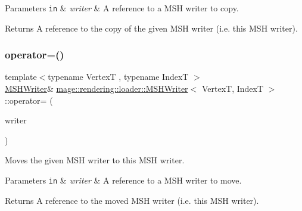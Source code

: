 \begin{DoxyParams}[1]{Parameters}
\mbox{\tt in}  & {\em writer} & A reference to a M\+SH writer to copy. \\
\hline
\end{DoxyParams}
\begin{DoxyReturn}{Returns}
A reference to the copy of the given M\+SH writer (i.\+e. this M\+SH writer). 
\end{DoxyReturn}
\hypertarget{classmage_1_1rendering_1_1loader_1_1_m_s_h_writer_a98bdde59fa1a7a6398453f0c7bc4e8dd}{}\label{classmage_1_1rendering_1_1loader_1_1_m_s_h_writer_a98bdde59fa1a7a6398453f0c7bc4e8dd} 
\subsubsection{\texorpdfstring{operator=()}{operator=()}\hspace{0.1cm}{\footnotesize\ttfamily [2/2]}}
{\footnotesize\ttfamily template$<$typename VertexT , typename IndexT $>$ \\
\hyperlink{classmage_1_1rendering_1_1loader_1_1_m_s_h_writer}{M\+S\+H\+Writer}\& \hyperlink{classmage_1_1rendering_1_1loader_1_1_m_s_h_writer}{mage\+::rendering\+::loader\+::\+M\+S\+H\+Writer}$<$ VertexT, IndexT $>$\+::operator= (\begin{DoxyParamCaption}\item[{\hyperlink{classmage_1_1rendering_1_1loader_1_1_m_s_h_writer}{M\+S\+H\+Writer}$<$ VertexT, IndexT $>$ \&\&}]{writer }\end{DoxyParamCaption})\hspace{0.3cm}{\ttfamily [delete]}}

Moves the given M\+SH writer to this M\+SH writer.


\begin{DoxyParams}[1]{Parameters}
\mbox{\tt in}  & {\em writer} & A reference to a M\+SH writer to move. \\
\hline
\end{DoxyParams}
\begin{DoxyReturn}{Returns}
A reference to the moved M\+SH writer (i.\+e. this M\+SH writer). 
\end{DoxyReturn}
\hypertarget{classmage_1_1rendering_1_1loader_1_1_m_s_h_writer_ad61ee7097e1bfb52ca9a0697d2cd6a7e}{}\label{classmage_1_1rendering_1_1loader_1_1_m_s_h_writer_ad61ee7097e1bfb52ca9a0697d2cd6a7e} 
